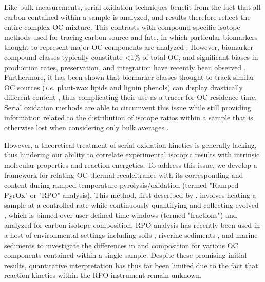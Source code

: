 Like bulk measurements, serial oxidation techniques benefit from the fact that all carbon contained within a sample is analyzed, and results therefore reflect the entire complex OC mixture. This contrasts with compound-specific isotope methods used for tracing carbon source and fate, in which particular biomarkers thought to represent major OC components are analyzed \citep[\textit{e.g.} plant-wax lipids;][]{Hayes:1989us,Eglinton:1996ff,Sessions:1999vg}. However, biomarker compound classes typically constitute <1\% of total OC, and significant biases in production rates, preservation, and integration have recently been observed \citep{Garcin:2014hg,Hemingway:2016bq}. Furthermore, it has been shown that biomarker classes thought to track similar OC sources (\textit{i.e.} plant-wax lipids and lignin phenols) can display drastically different  content \citep{Feng:2013il}, thus complicating their use as a tracer for OC residence time. Serial oxidation methods are able to circumvent this issue while still providing information related to the distribution of isotope ratios within a sample that is otherwise lost when considering only bulk averages \citep{Blair:2012du}.

However, a theoretical treatment of serial oxidation kinetics is generally lacking, thus hindering our ability to correlate experimental isotopic results with intrinsic molecular properties and reaction energetics. To address this issue, we develop a framework for relating OC thermal recalcitrance with its corresponding  and  content during ramped-temperature pyrolysis/oxidation (termed "Ramped PyrOx" or "RPO" analysis). This method, first described by \citet{Rosenheim:2008ed}, involves heating a sample at a controlled rate while continuously quantifying and collecting evolved , which is binned over user-defined time windows (termed "fractions") and analyzed for carbon isotope composition. RPO analysis has recently been used in a host of environmental settings including soils \citep{Plante:2013tu}, riverine sediments \citep{Rosenheim:2012kh,Rosenheim:2013dka,Schreiner:2014jr,Bianchi:2015jr}, and marine sediments \citep{Rosenheim:2013va,Subt:2016dh} to investigate the differences in  and  composition for various OC components contained within a single sample. Despite these promising initial results, quantitative interpretation has thus far been limited due to the fact that reaction kinetics within the RPO instrument remain unknown.

